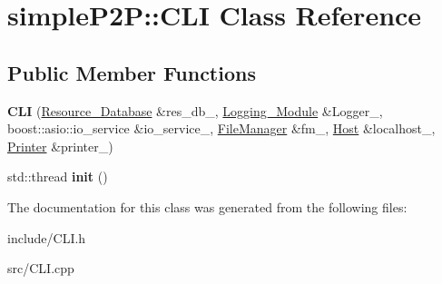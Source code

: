 \hypertarget{classsimpleP2P_1_1CLI}{}\section{simple\+P2P\+:\+:C\+LI Class Reference}
\label{classsimpleP2P_1_1CLI}
\subsection*{Public Member Functions}
\begin{DoxyCompactItemize}
\item 
\mbox{\label{classsimpleP2P_1_1CLI_ad050c491b2185e4230f47ff504f7e0ac}} 
{\bfseries C\+LI} (\hyperlink{classsimpleP2P_1_1Resource__Database}{Resource\+\_\+\+Database} \&res\+\_\+db\+\_\+, \hyperlink{classsimpleP2P_1_1Logging__Module}{Logging\+\_\+\+Module} \&Logger\+\_\+, boost\+::asio\+::io\+\_\+service \&io\+\_\+service\+\_\+, \hyperlink{classsimpleP2P_1_1FileManager}{File\+Manager} \&fm\+\_\+, \hyperlink{classsimpleP2P_1_1Host}{Host} \&localhost\+\_\+, \hyperlink{classsimpleP2P_1_1Printer}{Printer} \&printer\+\_\+)
\item 
\mbox{\label{classsimpleP2P_1_1CLI_a66ffb438b7ad05e349f6469bf5574521}} 
std\+::thread {\bfseries init} ()
\end{DoxyCompactItemize}


The documentation for this class was generated from the following files\+:\begin{DoxyCompactItemize}
\item 
include/C\+L\+I.\+h\item 
src/C\+L\+I.\+cpp\end{DoxyCompactItemize}
